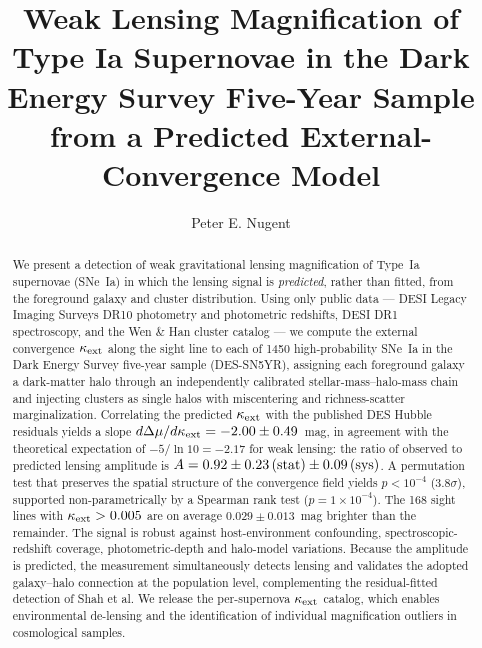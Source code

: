 \documentclass[twocolumn]{aastex701}
\newcommand{\kext}{\kappa_{\rm ext}}
\newcommand{\dmu}{\Delta\mu}
\begin{document}
\title{Weak Lensing Magnification of Type Ia Supernovae in the Dark Energy
Survey Five-Year Sample from a Predicted External-Convergence Model}

\author[0000-0002-3389-0586]{Peter E. Nugent}

\begin{abstract}
We present a detection of weak gravitational lensing magnification of
Type~Ia supernovae (SNe~Ia) in which the lensing signal is
\emph{predicted}, rather than fitted, from the foreground galaxy and
cluster distribution. Using only public data --- DESI Legacy Imaging
Surveys DR10 photometry and photometric redshifts, DESI DR1 spectroscopy,
and the Wen \& Han cluster catalog --- we compute the external convergence
$\kext$ along the sight line to each of 1450 high-probability SNe~Ia in
the Dark Energy Survey five-year sample (DES-SN5YR), assigning each
foreground galaxy a dark-matter halo through an independently calibrated
stellar-mass--halo-mass chain and injecting clusters as single halos with
miscentering and richness-scatter marginalization. Correlating the
predicted $\kext$ with the published DES Hubble residuals yields a slope
$d\dmu/d\kext = -2.00 \pm 0.49$~mag, in agreement with the theoretical
expectation of $-5/\ln 10 = -2.17$ for weak lensing: the ratio of observed
to predicted lensing amplitude is $A = 0.92 \pm 0.23\,{\rm (stat)} \pm
0.09\,{\rm (sys)}$. A permutation test that preserves the spatial
structure of the convergence field yields $p < 10^{-4}$
($3.8\sigma$), supported non-parametrically by a Spearman rank test
($p = 1\times10^{-4}$). The 168 sight lines with $\kext > 0.005$ are on
average $0.029 \pm 0.013$~mag brighter than the remainder. The signal is
robust against host-environment confounding, spectroscopic-redshift
coverage, photometric-depth and halo-model variations. Because the amplitude
is predicted, the measurement simultaneously detects lensing and validates
the adopted galaxy--halo connection at the population level,
complementing the residual-fitted detection of Shah et al. We release the
per-supernova $\kext$ catalog, which enables environmental de-lensing and
the identification of individual magnification outliers in cosmological
samples.
\end{abstract}

\end{document}
